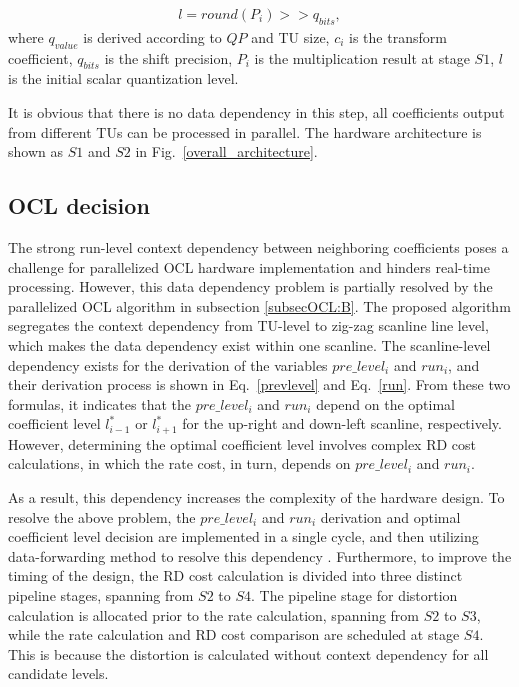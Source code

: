 \documentclass[lettersize,journal]{IEEEtran}
\begin{document}
\begin{equation}\label{l}
	\begin{aligned}
		l = round \left ( P_{i} \right ) >> q_{bits},
	\end{aligned}
\end{equation}
where $q_{value}$ is derived according to $QP$ and TU size, $c_{i}$ is the transform coefficient, $q_{bits}$ is the shift precision, $P_{i}$ is the multiplication result at stage $S1$, $l$ is the initial scalar quantization level.

It is obvious that there is no data dependency in this step, all coefficients output from different TUs can be processed in parallel. The hardware architecture is shown as $S1$ and $S2$ in Fig.~\ref{overall_architecture}. 

\subsection{OCL decision}

The strong run-level context dependency between neighboring coefficients poses a challenge for parallelized OCL hardware implementation and hinders real-time processing. However, this data dependency problem is partially resolved by the parallelized OCL algorithm in subsection \ref{subsecOCL:B}. 
The proposed algorithm segregates the context dependency from TU-level to zig-zag scanline line level, which makes the data dependency exist within one scanline. The scanline-level dependency exists for the derivation of the variables $pre\_level_i$ and $run_i$, and their derivation process is shown in Eq.~\eqref{prevlevel} and Eq.~\eqref{run}. From these two formulas, it indicates that the $pre\_level_i$ and $run_i$ depend on the optimal coefficient level $l _{i-1}^{*}$ or $l _{i+1}^{*}$ for the up-right and down-left scanline, respectively. However, determining the optimal coefficient level involves complex RD cost calculations, in which the rate cost, in turn, depends on $pre\_level_i$ and $run_i$. 

As a result, this dependency increases the complexity of the hardware design. To resolve the above problem, the $pre\_level_i$ and $run_i$ derivation and optimal coefficient level decision are implemented in a single cycle, and then utilizing data-forwarding method to resolve this dependency \cite{harris2010digital}. 
Furthermore, to improve the timing of the design, the RD cost calculation is divided into three distinct pipeline stages, spanning from $S2$ to $S4$. 
The pipeline stage for distortion calculation is allocated prior to the rate calculation, spanning from $S2$ to $S3$, while the rate calculation and RD cost comparison are scheduled at stage $S4$. This is because the distortion is calculated without context dependency for all candidate levels.
\end{document}
